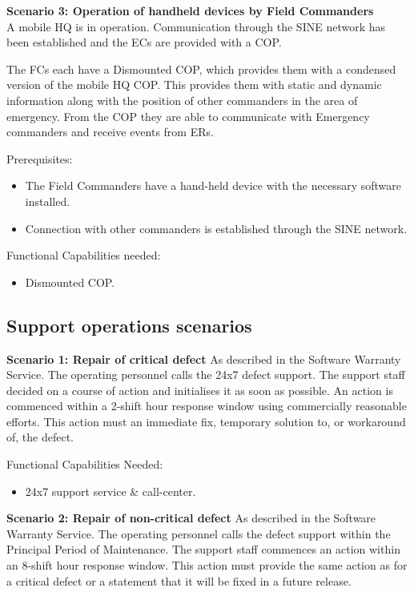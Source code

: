 \vspace{20pt}
\noindent \textbf{Scenario 3: Operation of handheld devices by Field Commanders} \\
A mobile HQ is in operation. Communication through the SINE network has been established and the ECs are provided with a COP. 

The FCs each have a Dismounted COP, which provides them with a condensed version of the mobile HQ COP. This provides them with static and dynamic information along with the position of other commanders in the area of emergency. From the COP they are able to communicate with Emergency commanders and receive events from ERs.

\noindent Prerequisites:
\begin{itemize}
	\itemsep0em
	\item The Field Commanders have a hand-held device with the necessary software installed.
	\item Connection with other commanders is  established through the SINE network.
\end{itemize}

\noindent Functional Capabilities needed:
\begin{itemize}
	\item Dismounted COP.
\end{itemize}

\subsection{Support operations scenarios}
\noindent \textbf{Scenario 1: Repair of critical defect}
As described in the Software Warranty Service.
The operating personnel calls the 24x7 defect support. The support staff decided on a course of action and initialises it as soon as possible. An action is commenced within a 2-shift hour response window using commercially reasonable efforts. This action must an immediate fix, temporary solution to, or workaround of, the defect.

\noindent Functional Capabilities Needed:
\begin{itemize}
	\item 24x7 support service \& call-center.
\end{itemize}

\vspace{20pt}
\noindent \textbf{Scenario 2: Repair of non-critical defect}
As described in the Software Warranty Service.
The operating personnel calls the defect support within the Principal Period of Maintenance. The support staff commences an action within an 8-shift hour response window. This action must provide the same action as for a critical defect or a statement that it will be fixed in a future release. \\

